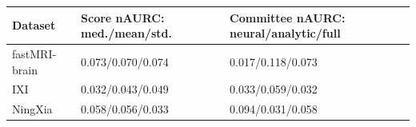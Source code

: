 \begin{tabular}{lll}
\toprule
Dataset & Score nAURC: med./mean/std. & Committee nAURC: neural/analytic/full \\
\midrule
fastMRI-brain & 0.073/0.070/0.074 & 0.017/0.118/0.073 \\
IXI & 0.032/0.043/0.049 & 0.033/0.059/0.032 \\
NingXia & 0.058/0.056/0.033 & 0.094/0.031/0.058 \\
\bottomrule
\end{tabular}
